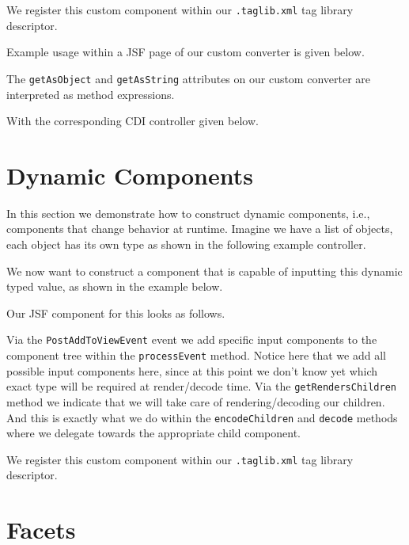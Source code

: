 We register this custom component within our \texttt{.taglib.xml} tag library descriptor.


Example usage within a JSF page of our custom converter is given below.

The \texttt{getAsObject} and \texttt{getAsString} attributes on our custom converter are interpreted as method expressions.

With the corresponding CDI controller given below.



\section{Dynamic Components}
In this section we demonstrate how to construct dynamic components, i.e., components that change behavior at runtime.
Imagine we have a list of objects, each object has its own type as shown in the following example controller.


We now want to construct a component that is capable of inputting this dynamic typed value, as shown in the example below.


Our JSF component for this looks as follows.

Via the \texttt{PostAddToViewEvent} event we add specific input components to the component tree within the \texttt{processEvent} method.
Notice here that we add all possible input components here,  since at this point we don't know yet which exact type will be required at render/decode time.
Via the \texttt{getRendersChildren} method we indicate that we will take care of rendering/decoding our children.
And this is exactly what we do within the \texttt{encodeChildren} and \texttt{decode} methods where we delegate towards the appropriate child component.

We register this custom component within our \texttt{.taglib.xml} tag library descriptor.


\section{Facets}